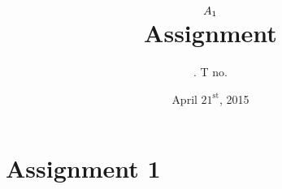 \documentclass[11pt]{article}
\title{
	$A_{\ass}$ \\
	{\large Assignment \ass}
}
\author{
	\name. T no. \tno
}
\date{April $21^{\text{st}}$, 2015}
\newcommand{\ass}{1}
\begin{document}
\maketitle

\section{Assignment \ass}


\begin{question}
\end{question}
\end{document}
